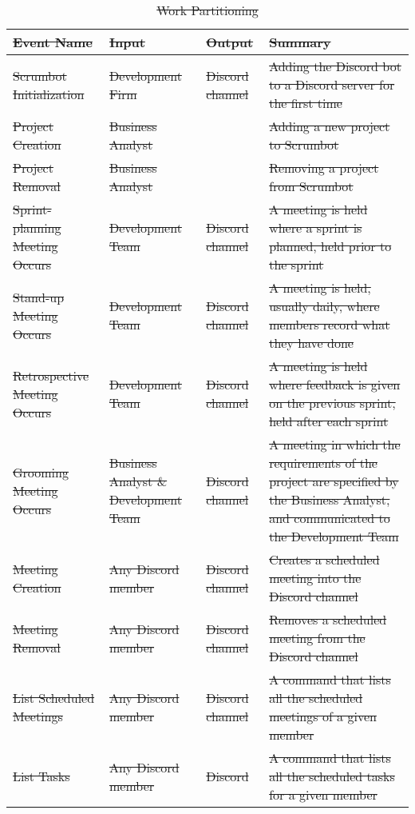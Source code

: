\documentclass[12pt, titlepage]{article}
\begin{document}
\begin{longtable}{|L{4cm}|L{3cm}|L{1.5cm}|L{6cm}|}
    \caption{\sout{Work Partitioning}}
    \label{tab:my_label}\\
    \hline
    \sout{Event Name} & \sout{Input} & \sout{Output} & \sout{Summary} \\
    \hline
    \sout{Scrumbot Initialization} & \sout{Development Firm} & \sout{Discord channel} & \sout{Adding the Discord bot to a Discord server for the first time}\\
    \hline
    \sout{Project Creation} & \sout{Business Analyst} & & \sout{Adding a new project to Scrumbot}\\
    \hline
    \sout{Project Removal} & \sout{Business Analyst} & & \sout{Removing a project from Scrumbot}\\
    \hline
    \sout{Sprint-planning Meeting Occurs} & \sout{Development Team} & \sout{Discord channel} & \sout{A meeting is held where a sprint is planned, held prior to the sprint}\\
    \hline
    \sout{Stand-up Meeting Occurs} & \sout{Development Team} & \sout{Discord channel} & \sout{A meeting is held, usually daily, where members record what they have done}\\
    \hline
    \sout{Retrospective Meeting Occurs} & \sout{Development Team} & \sout{Discord channel} & \sout{A meeting is held where feedback is given on the previous sprint, held after each sprint}\\
    \hline
    \sout{Grooming Meeting Occurs} & \sout{Business Analyst \& Development Team} & \sout{Discord channel} & \sout{A meeting in which the requirements of the project are specified by the Business Analyst, and communicated to the Development Team}\\
    \hline
    \sout{Meeting Creation} & \sout{Any Discord member} & \sout{Discord channel} & \sout{Creates a scheduled meeting into the Discord channel}\\
    \hline
    \sout{Meeting Removal} & \sout{Any Discord member} & \sout{Discord channel} & \sout{Removes a scheduled meeting from the Discord channel}\\
    \hline
    \sout{List Scheduled Meetings} & \sout{Any Discord member} & \sout{Discord channel} & \sout{A command that lists all the scheduled meetings of a given member}\\
    \hline
    \sout{List Tasks} & \sout{Any Discord member} & \sout{Discord} & \sout{A command that lists all the scheduled tasks for a given member}\\
    \hline
\end{longtable}
\end{document}
